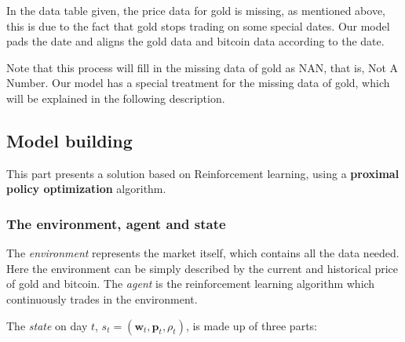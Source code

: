 \documentclass{mcmthesis}
\begin{document}


In the data table given, the price data for gold is missing, as mentioned above, this is due to the fact that gold stops trading on some special dates. Our model pads the date and aligns the gold data and bitcoin data according to the date.

Note that this process will fill in the missing data of gold as NAN, that is, Not A Number. Our model has a special treatment for the missing data of gold, which will be explained in the following description.


\subsection{Model building}

This part presents a solution based on Reinforcement learning,
using a \textbf{proximal policy optimization} algorithm.

\subsubsection{The environment, agent and state}

The \textit{environment} represents the market itself,
which contains all the data needed.
Here the environment can be simply described
by the current and historical price of gold and bitcoin.
The \textit{agent} is the reinforcement learning algorithm which
continuously trades in the environment.

The \textit{state} on day $t$, $s_t = (\pmb{w}_t, \pmb{p}_t, \rho _t)$, is made up of three parts:
\end{document}
